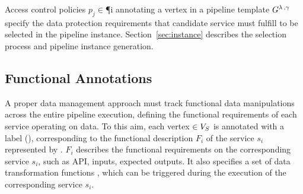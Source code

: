 Access control policies $p_j$$\in$\P{i} annotating a vertex  in a pipeline template $G^{\lambda\,,\gamma\,}$ specify the data protection requirements that candidate service must fulfill to be selected in the pipeline instance. Section~\ref{sec:instance} describes the selection process and pipeline instance generation.


\subsection{Functional Annotations}\label{sec:funcannotation}
A proper data management approach must track functional data manipulations across the entire pipeline execution, defining the functional requirements of each service operating on data.
To this aim, each vertex $\in V_S$ is annotated with a label \myGamma(), corresponding to the functional description $F_i$ of the service $s_i$ represented by .
$F_i$ describes the functional requirements on the corresponding service $s_i$, such as API, inputs, expected outputs.
It also specifies a set \TF{} of data transformation functions , which can be triggered during the execution of the corresponding service $s_i$.

